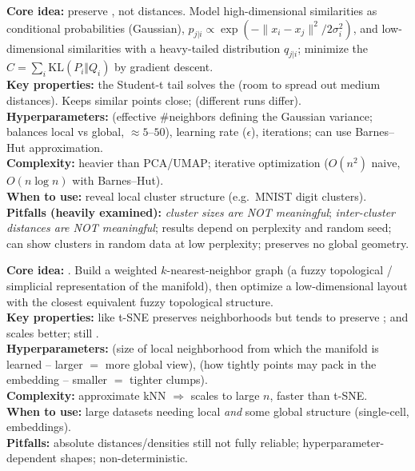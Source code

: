 \begin{algobox}
\textbf{Core idea:} preserve , not distances. Model
high-dimensional similarities as conditional probabilities (Gaussian),
$p_{j|i}\propto\exp(-\lVert x_i-x_j\rVert^2/2\sigma_i^2)$, and low-dimensional
similarities with a heavy-tailed  distribution $q_{j|i}$;
minimize the 
$C=\sum_i \mathrm{KL}(P_i\Vert Q_i)$ by gradient descent.\\
\textbf{Key properties:} the Student-t tail solves the 
(room to spread out medium distances). Keeps similar points close;
 (different runs differ).\\
\textbf{Hyperparameters:}  (effective \#neighbors defining the
Gaussian variance; balances local vs global, $\approx 5$--$50$), learning rate
($\epsilon$), iterations; can use Barnes--Hut approximation.\\
\textbf{Complexity:} heavier than PCA/UMAP; iterative optimization
($O(n^2)$ naive, $O(n\log n)$ with Barnes--Hut).\\
\textbf{When to use:} reveal local cluster structure (e.g.\ MNIST digit clusters).\\
\textbf{Pitfalls (heavily examined):} \emph{cluster sizes are NOT meaningful};
\emph{inter-cluster distances are NOT meaningful}; results depend on perplexity
and random seed; can show clusters in random data at low perplexity; preserves
no global geometry.
\end{algobox}

\begin{algobox}
\textbf{Core idea:} . Build a weighted
$k$-nearest-neighbor graph (a fuzzy topological / simplicial representation of the
manifold), then optimize a low-dimensional layout with the closest equivalent
fuzzy topological structure.\\
\textbf{Key properties:} like t-SNE preserves  neighborhoods but
tends to preserve ;  and scales better;
still .\\
\textbf{Hyperparameters:}  (size of local neighborhood from
which the manifold is learned -- larger $=$ more global view), 
(how tightly points may pack in the embedding -- smaller $=$ tighter clumps).\\
\textbf{Complexity:} approximate kNN $\Rightarrow$ scales to large $n$, faster
than t-SNE.\\
\textbf{When to use:} large datasets needing local \emph{and} some global
structure (single-cell, embeddings).\\
\textbf{Pitfalls:} absolute distances/densities still not fully reliable;
hyperparameter-dependent shapes; non-deterministic.
\end{algobox}

